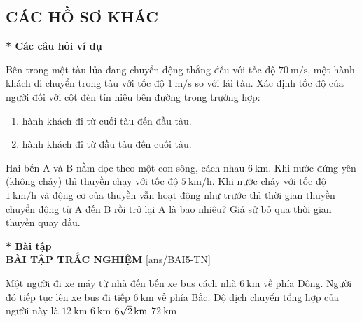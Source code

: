 \subsection{CÁC HỒ SƠ KHÁC}
\textbf{* Các câu hỏi ví dụ}\\
\setcounter{ex}{0}
\begin{ex}
	Bên trong một tàu lửa đang chuyển động thẳng đều với tốc độ $\SI{70}{\meter/\second}$, một hành khách di chuyển trong tàu với tốc độ $\SI{1}{\meter/\second}$ so với lái tàu. Xác định tốc độ của người đối với cột đèn tín hiệu bên đường trong trường hợp:
	\begin{enumerate}[label=\alph*)]
		\item hành khách đi từ cuối tàu đến đầu tàu.
		\item hành khách đi từ đầu tàu đến cuối tàu.
	\end{enumerate}
	
\end{ex}
\begin{ex}
	Hai bến A và B nằm dọc theo một con sông, cách nhau $\SI{6}{\kilo\meter}$. Khi nước đứng yên (không chảy) thì thuyền chạy với tốc độ $\SI{5}{\kilo\meter/\hour}$. Khi nước chảy  với tốc độ $\SI{1}{\kilo\meter/\hour}$ và động cơ của thuyền vẫn hoạt động như trước thì thời gian thuyền chuyển động từ A đến B rồi trở lại A là bao nhiêu? Giả sử bỏ qua thời gian thuyền quay đầu.
	
\end{ex}
\textbf{* Bài tập}\\
\textbf{BÀI TẬP TRẮC NGHIỆM}
\setcounter{ex}{0}
[ans/BAI5-TN]
\begin{ex}
	Một người đi xe máy từ nhà đến bến xe bus cách nhà $\SI{6}{\kilo\meter}$ về phía Đông. Người đó tiếp tục lên xe bus đi tiếp $\SI{6}{\kilo\meter}$ về phía Bắc. Độ dịch chuyển tổng hợp của người này là	
	\choice
	{$\SI{12}{\kilo\meter}$}
	{$\SI{6}{\kilo\meter}$}
	{\True $\xsi{6\sqrt{2}}{\kilo\meter}$}
	{$\SI{72}{\kilo\meter}$}
	\loigiai{}
\end{ex}
